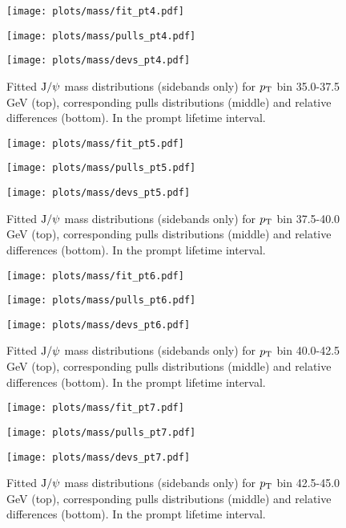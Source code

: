 \pagebreak

\begin{figure}[h!]
\centering
\texttt{[image: plots/mass/fit\_pt4.pdf]}

\texttt{[image: plots/mass/pulls\_pt4.pdf]}

\texttt{[image: plots/mass/devs\_pt4.pdf]}

\caption{Fitted $\text{J/}\psi$ mass distributions (sidebands only) for $p_\text{T}$ bin 35.0-37.5 GeV (top), corresponding pulls distributions (middle) and relative differences (bottom). In the prompt lifetime interval.}\label{f:m_fit_4}
\end{figure}

\pagebreak

\begin{figure}[h!]
\centering
\texttt{[image: plots/mass/fit\_pt5.pdf]}

\texttt{[image: plots/mass/pulls\_pt5.pdf]}

\texttt{[image: plots/mass/devs\_pt5.pdf]}

\caption{Fitted $\text{J/}\psi$ mass distributions (sidebands only) for $p_\text{T}$ bin 37.5-40.0 GeV (top), corresponding pulls distributions (middle) and relative differences (bottom). In the prompt lifetime interval.}\label{f:m_fit_5}
\end{figure}

\pagebreak

\begin{figure}[h!]
\centering
\texttt{[image: plots/mass/fit\_pt6.pdf]}

\texttt{[image: plots/mass/pulls\_pt6.pdf]}

\texttt{[image: plots/mass/devs\_pt6.pdf]}

\caption{Fitted $\text{J/}\psi$ mass distributions (sidebands only) for $p_\text{T}$ bin 40.0-42.5 GeV (top), corresponding pulls distributions (middle) and relative differences (bottom). In the prompt lifetime interval.}\label{f:m_fit_6}
\end{figure}

\pagebreak

\begin{figure}[h!]
\centering
\texttt{[image: plots/mass/fit\_pt7.pdf]}

\texttt{[image: plots/mass/pulls\_pt7.pdf]}

\texttt{[image: plots/mass/devs\_pt7.pdf]}

\caption{Fitted $\text{J/}\psi$ mass distributions (sidebands only) for $p_\text{T}$ bin 42.5-45.0 GeV (top), corresponding pulls distributions (middle) and relative differences (bottom). In the prompt lifetime interval.}\label{f:m_fit_7}
\end{figure}


